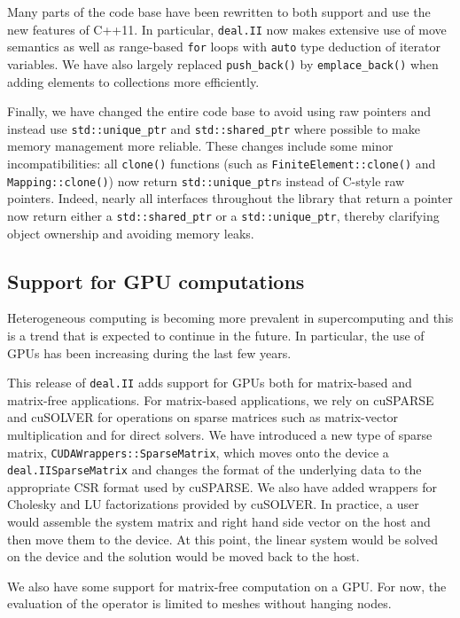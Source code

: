 \documentclass{ansarticle-preprint}
\newcommand{\specialword}[1]{\texttt{#1}}
\newcommand{\dealii}{{\specialword{deal.II}}\xspace}
\begin{document}
Many parts of the code base have been rewritten to both support and
use the new features of C++11. In particular, \dealii now makes
extensive use of move semantics as well as range-based \texttt{for}
loops with \texttt{auto} type deduction of iterator variables. We have
also largely replaced \texttt{push\_back()} by
\texttt{emplace\_back()} when adding elements to collections more
efficiently.

Finally, we have changed the entire code base to avoid using raw
pointers and instead use \texttt{std::unique\_ptr} and
\texttt{std::shared\_ptr} where possible to make memory management
more reliable. These changes include some minor incompatibilities: all
\texttt{clone()} functions (such as \texttt{FiniteElement::clone()} and
\texttt{Mapping::clone()}) now return \texttt{std::unique\_ptr}s instead of
C-style raw pointers. Indeed, nearly all interfaces throughout the library that return a pointer
now return either a \texttt{std::shared\_ptr} or a \texttt{std::unique\_ptr},
thereby clarifying object ownership and avoiding memory leaks.


\subsection{Support for GPU computations}

Heterogeneous computing is becoming more prevalent in supercomputing and this is
a trend that is expected to continue in the future. In particular, the use of
GPUs has been increasing during the last few years.

This release of \dealii adds support for GPUs both for matrix-based and
matrix-free applications. For matrix-based applications, we rely on
cuSPARSE \cite{cusparse} and cuSOLVER \cite{cusolver} for operations on sparse
matrices such as matrix-vector multiplication and for direct solvers. We have
introduced a new type of sparse matrix, \texttt{CUDAWrappers::SparseMatrix},
which moves onto the device a \dealii \texttt{SparseMatrix} and changes the
format of the underlying data to the appropriate CSR format used by cuSPARSE. We
also have added wrappers for Cholesky and LU factorizations provided by
cuSOLVER. In practice, a user would assemble the system matrix and
right hand side vector
on the host and then move them to the device. At this point, the
linear system
would be solved on the device and the solution would be moved back to the host.

We also have some support for matrix-free computation on a GPU. For now, the
evaluation of the operator is limited to meshes without hanging nodes.
\end{document}
